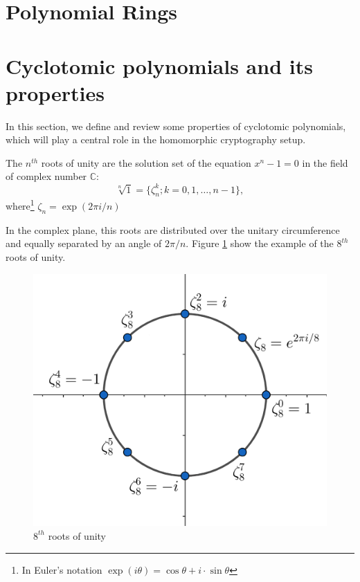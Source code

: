 \section{Polynomial Rings}

\section{Cyclotomic polynomials and its properties}

In this section, we define and review some properties of cyclotomic polynomials, which will play a central role in the homomorphic cryptography setup.

\begin{definition} The $n^{th}$ roots of unity are the solution set of the equation $x^n-1=0$ in the field of complex number $\mathbb C$:
$$\sqrt[n]1=\{\zeta_n^k;k=0,1,\ldots,n-1\},$$
where\footnote{In Euler's notation $\exp{(i\theta)}=\cos\theta+i\cdot\sin\theta$} $\zeta_n=\exp{(2\pi i/n)}$
\end{definition}
In the complex plane, this roots are distributed over the unitary circumference and equally separated by an angle of $2\pi/n$. Figure \ref{fig:roots_of_unity} show the example of the $8^{th}$ roots of unity.

\begin{figure}[!htb]
    \centering
    \includegraphics[scale=0.4]{files/figures/roots_of_unity.png}
    \caption{$8^{th}$ roots of unity}
    \label{fig:roots_of_unity}
\end{figure}

